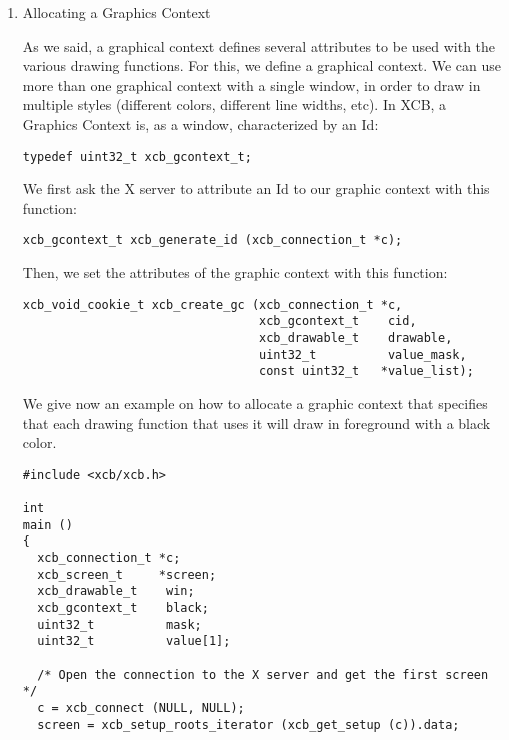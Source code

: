 \documentclass[12pt,oneside,titlepage]{book}
\begin{document}
\begin{enumerate}
  \begin{enumerate}
  \item
    \protect\hypertarget{allocgc}{}{Allocating a Graphics Context}

    As we said, a graphical context defines several attributes to be
    used with the various drawing functions. For this, we define a
    graphical context. We can use more than one graphical context with a
    single window, in order to draw in multiple styles (different
    colors, different line widths, etc). In XCB, a Graphics Context is,
    as a window, characterized by an Id:

\begin{verbatim}
typedef uint32_t xcb_gcontext_t;
\end{verbatim}

    We first ask the X server to attribute an Id to our graphic context
    with this function:

\begin{verbatim}
xcb_gcontext_t xcb_generate_id (xcb_connection_t *c);
\end{verbatim}

    Then, we set the attributes of the graphic context with this
    function:

\begin{verbatim}
xcb_void_cookie_t xcb_create_gc (xcb_connection_t *c,
                                 xcb_gcontext_t    cid,
                                 xcb_drawable_t    drawable,
                                 uint32_t          value_mask,
                                 const uint32_t   *value_list);
\end{verbatim}

    We give now an example on how to allocate a graphic context that
    specifies that each drawing function that uses it will draw in
    foreground with a black color.

\begin{verbatim}
#include <xcb/xcb.h>

int
main ()
{
  xcb_connection_t *c;
  xcb_screen_t     *screen;
  xcb_drawable_t    win;
  xcb_gcontext_t    black;
  uint32_t          mask;
  uint32_t          value[1];

  /* Open the connection to the X server and get the first screen */
  c = xcb_connect (NULL, NULL);
  screen = xcb_setup_roots_iterator (xcb_get_setup (c)).data;


\end{verbatim}
\end{enumerate}
\end{enumerate}
\end{document}
